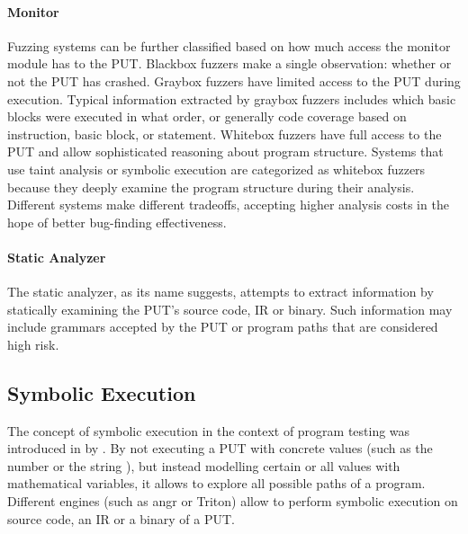 \documentclass{article}
\begin{document}
\begin{multicols}{2}
    \paragraph{Monitor}
    Fuzzing systems can be further classified based on how much access the monitor module has to the PUT. Blackbox fuzzers make a single observation: whether or not the PUT has crashed. Graybox fuzzers have limited access to the PUT during execution. Typical information extracted by graybox fuzzers includes which basic blocks were executed in what order, or generally code coverage based on instruction, basic block, or statement. Whitebox fuzzers have full access to the PUT and allow sophisticated reasoning about program structure. Systems that use taint analysis or symbolic execution are categorized as whitebox fuzzers because they deeply examine the program structure during their analysis. Different systems make different tradeoffs, accepting higher analysis costs in the hope of better bug-finding effectiveness.\cite{EvaluatingFuzzTesting}

    \paragraph{Static Analyzer}
    The static analyzer, as its name suggests, attempts to extract information by statically examining the PUT's source code, IR or binary. Such information may include grammars accepted by the PUT or program paths that are considered high risk.

    \subsection{Symbolic Execution}
    \label{SymbolicExecution}
    The concept of symbolic execution in the context of program testing was introduced in \citeyear{Symbex} by \citeauthor{Symbex}.\cite{Symbex} By not executing a PUT with concrete values (such as the number  or the string ), but instead modelling certain or all values with mathematical variables, it allows to explore all possible paths of a program. Different engines (such as angr\cite{angr} or Triton\cite{Triton}) allow to perform symbolic execution on source code, an IR or a binary of a PUT.


\end{multicols}
\end{document}

